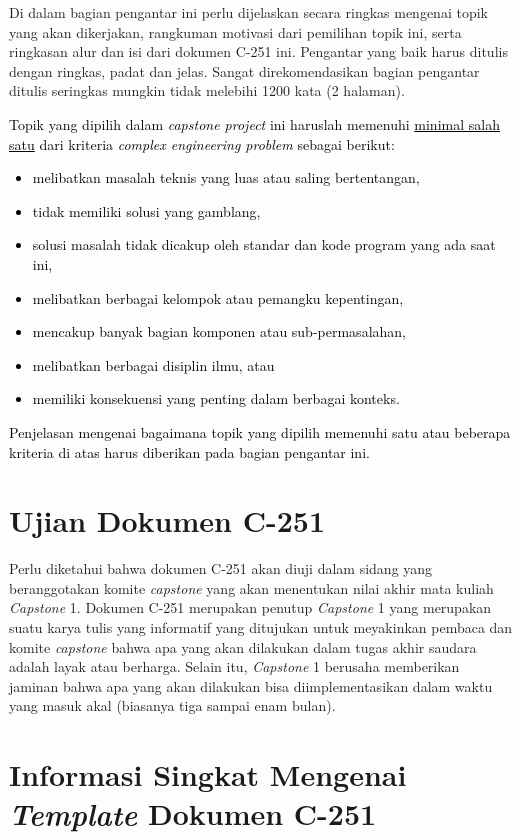 Di dalam bagian pengantar ini perlu dijelaskan secara ringkas mengenai topik yang akan dikerjakan, rangkuman motivasi dari pemilihan topik ini, serta ringkasan alur dan isi dari dokumen C-251 ini. Pengantar yang baik harus ditulis dengan ringkas, padat dan jelas. Sangat direkomendasikan bagian pengantar ditulis seringkas mungkin tidak melebihi 1200 kata (2 halaman).

\textcolor{black}{Topik yang dipilih dalam \textit{capstone project} ini haruslah memenuhi \underline{minimal salah satu} dari kriteria \textit{complex engineering problem} sebagai berikut:
\begin{itemize}
    \item melibatkan masalah teknis yang luas atau saling bertentangan,
    \item tidak memiliki solusi yang gamblang,
    \item solusi masalah tidak dicakup oleh standar dan kode program yang ada saat ini,
    \item melibatkan berbagai kelompok atau pemangku kepentingan,
    \item mencakup banyak bagian komponen atau sub-permasalahan,
    \item melibatkan berbagai disiplin ilmu, atau
    \item memiliki konsekuensi yang penting dalam berbagai konteks.
\end{itemize}
Penjelasan mengenai bagaimana topik yang dipilih memenuhi satu atau beberapa kriteria di atas harus diberikan pada bagian pengantar ini.
}

\section{Ujian Dokumen C-251}
\label{sec:Ujian_Dokumen_C-251}
    
    Perlu diketahui bahwa dokumen C-251 akan diuji dalam sidang yang beranggotakan komite \textit{capstone} yang akan menentukan nilai akhir mata kuliah \textit{Capstone} 1. Dokumen C-251 merupakan penutup \textit{Capstone} 1 yang merupakan suatu karya tulis yang informatif yang ditujukan untuk meyakinkan pembaca dan komite \textit{capstone} bahwa apa yang akan dilakukan dalam tugas akhir saudara adalah layak atau berharga. Selain itu, \textit{Capstone} 1 berusaha memberikan jaminan bahwa apa yang akan dilakukan bisa diimplementasikan dalam waktu yang masuk akal (biasanya tiga sampai enam bulan).

\section{Informasi Singkat Mengenai \textit{Template} Dokumen C-251}
\label{sec:Informasi_Singkat_Mengenai_Template_Dokumen_C-251}

